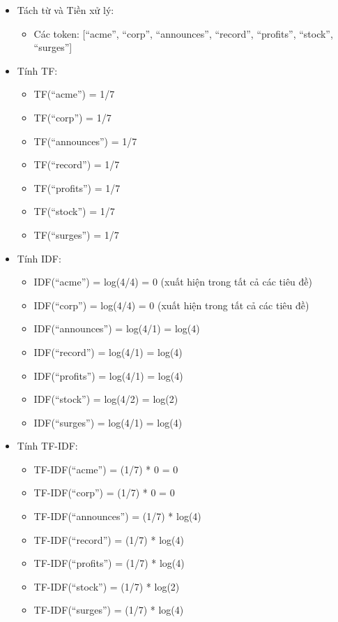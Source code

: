 \begin{itemize}
  \item Tách từ và Tiền xử lý:
  \begin{itemize}
    \item Các token: [``acme'', ``corp'', ``announces'', ``record'', ``profits'', ``stock'', ``surges'']
  \end{itemize}
  \item Tính TF:
  \begin{itemize}
    \item TF(``acme'') = 1/7
    \item TF(``corp'') = 1/7
    \item TF(``announces'') = 1/7
    \item TF(``record'') = 1/7
    \item TF(``profits'') = 1/7
    \item TF(``stock'') = 1/7
    \item TF(``surges'') = 1/7
  \end{itemize}
  \item Tính IDF:
  \begin{itemize}
    \item IDF(``acme'') = log(4/4) = 0 (xuất hiện trong tất cả các tiêu đề)
    \item IDF(``corp'') = log(4/4) = 0 (xuất hiện trong tất cả các tiêu đề)
    \item IDF(``announces'') = log(4/1) = log(4)
    \item IDF(``record'') = log(4/1) = log(4)
    \item IDF(``profits'') = log(4/1) = log(4)
    \item IDF(``stock'') = log(4/2) = log(2)
    \item IDF(``surges'') = log(4/1) = log(4)
  \end{itemize}
  \item Tính TF-IDF:
  \begin{itemize}
    \item TF-IDF(``acme'') = (1/7) * 0 = 0
    \item TF-IDF(``corp'') = (1/7) * 0 = 0
    \item TF-IDF(``announces'') = (1/7) * log(4)
    \item TF-IDF(``record'') = (1/7) * log(4)
    \item TF-IDF(``profits'') = (1/7) * log(4)
    \item TF-IDF(``stock'') = (1/7) * log(2)
    \item TF-IDF(``surges'') = (1/7) * log(4)
  \end{itemize}
\end{itemize}

